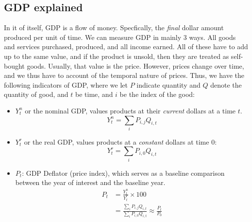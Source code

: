 \documentclass[11pt]{article}
\begin{document}
\subsection{GDP explained}
In it of itself, GDP is a flow of money. Specfically, the \emph{final} dollar amount produced per unit of time. We can measure GDP in mainly 3 ways. All goods and services purchased, produced, and all income earned. All of these have to add up to the same value, and if the product is unsold, then they are treated as self-bought goods. Usually, that value is the price. However, prices change over time, and we thus have to account of the temporal nature of prices. Thus, we have the following indicators of GDP, where we let $P$ indicate quantity and $Q$ denote the quantity of good, and $t$ be time, and $i$ be the index of the good:
\begin{itemize}
    \item $Y^n_t$ or the nominal GDP, values products at their \emph{current} dollars at a time $t$. \[
    Y^n_t = \sum_i P_{i,j}Q_{i,t}
    \]
    \item $Y^r_t$ or the real GDP, values products at a \emph{constant} dollars at time 0:\[Y^r_t = \sum_i P_{i,0} Q_{i,t}\]
    \item $P_t$: GDP Deflator (price index), which serves as a baseline comparison between the year of interest and the baseline year. 
    \begin{align*}
        P_t &= \frac{Y^n_t}{Y^r_t} \times 100 \\
        &= \frac{\sum_i P_{i,j}Q_{i,t}}{\sum_i P_{i,0} Q_{i,t}} \approx \frac{P_t}{P_0}
    \end{align*}
\end{itemize}
\end{document}
